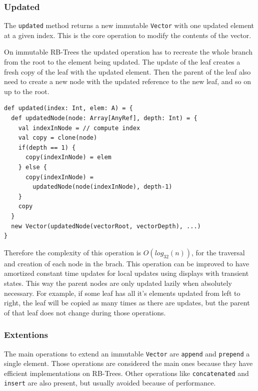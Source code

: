 
\subsubsection{Updated}
The \texttt{updated} method returns a new immutable \texttt{Vector} with one updated element at a given index. This is the core operation to modify the contents of the vector. 

On immutable RB-Trees the updated operation has to recreate the whole branch from the root to the element being updated. The update of the leaf creates a fresh copy of the leaf with the updated element. Then the parent of the leaf also need to create a new node with the updated reference to the new leaf, and so on up to the root. 

\begin{lstlisting}[frame=single]
def updated(index: Int, elem: A) = {
  def updatedNode(node: Array[AnyRef], depth: Int) = {
    val indexInNode = // compute index
    val copy = clone(node)
    if(depth == 1) {
      copy(indexInNode) = elem
    } else {
      copy(indexInNode) = 
        updatedNode(node(indexInNode), depth-1)
    }
    copy
  }
  new Vector(updatedNode(vectorRoot, vectorDepth), ...)
}
\end{lstlisting}

Therefore the complexity of this operation is $O(log_{32}(n))$, for the traversal and creation of each node in the brach. This operation can be improved to have amortized constant time updates for local updates using displays with transient states. This way the parent nodes are only updated lazily when absolutely necessary. For example, if some leaf has all it's elements updated from left to right, the leaf will be copied as many times as there are updates, but the parent of that leaf does not change during those operations.


\subsubsection{Extentions}
The main operations to extend an immutable \texttt{Vector} are \texttt{append} and \texttt{prepend} a single element. Those operations are considered the main ones because they have efficient implementations on RB-Trees. Other operations like \texttt{concatenated} and \texttt{insert} are also present, but usually avoided because of performance.



